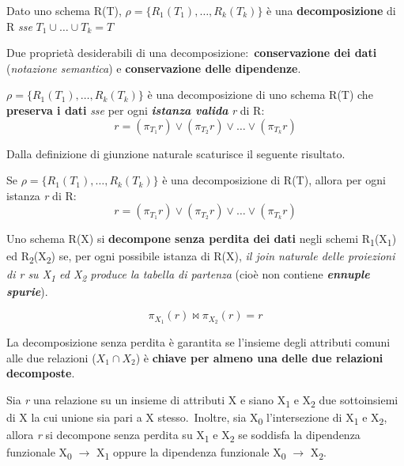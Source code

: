 \begin{definition}
	Dato uno schema R(T),
	$\rho = \{R_1(T_1), \dots, R_k(T_k)\}$ è una \textbf{decomposizione} di R \textit{sse} $T_1 \cup \dots \cup T_k = T$
\end{definition}

\noindent Due proprietà desiderabili di una decomposizione:\ \textbf{conservazione dei dati} (\textit{notazione semantica}) e \textbf{conservazione delle dipendenze}.\

\begin{definition}
	$\rho = \{R_1(T_1), \dots, R_k(T_k) \}$ è una decomposizione di uno schema R(T) che \textbf{preserva i dati} \textit{sse} per ogni \textbf{\textit{istanza valida}} \textit{r} di R:\
	\[
		r = (\pi_{T_1}r) \lor (\pi_{T_2}r) \lor \dots \lor (\pi_{T_k}r)
	\]
\end{definition}

\noindent Dalla definizione di giunzione naturale scaturisce il seguente risultato.\

\begin{theorem}
	Se $\rho = \{R_1(T_1), \dots, R_k(T_k)\}$ è una decomposizione di R(T), allora per ogni istanza \textit{r} di R:
	\[
		r = (\pi_{T_1}r) \lor (\pi_{T_2}r) \lor \dots \lor (\pi_{T_k}r)
	\]
\end{theorem}

\noindent Uno schema R(X) si \textbf{decompone senza perdita dei dati} negli schemi R\textsubscript{1}(X\textsubscript{1}) ed R\textsubscript{2}(X\textsubscript{2}) se, per ogni possibile istanza di R(X), \textit{il join naturale delle proiezioni di r su X\textsubscript{1} ed X\textsubscript{2} produce la tabella di partenza} (cioè non contiene \textbf{\textit{ennuple spurie}}).

\[
	\pi_{X_1}(r) \Join \pi_{X_2}(r) = r
\]

\noindent La decomposizione senza perdita è garantita se l'insieme degli attributi comuni alle due relazioni ($X_1 \cap X_2$) è \textbf{chiave per almeno una delle due relazioni decomposte}.

Sia \textit{r} una relazione su un insieme di attributi X e siano X\textsubscript{1} e X\textsubscript{2} due sottoinsiemi di X la cui unione sia pari a X stesso.\
Inoltre, sia X\textsubscript{0} l'intersezione di X\textsubscript{1} e X\textsubscript{2}, allora \textit{r} si decompone senza perdita su X\textsubscript{1} e X\textsubscript{2} se soddisfa la dipendenza funzionale X\textsubscript{0} $\rightarrow$ X\textsubscript{1} oppure la dipendenza funzionale X\textsubscript{0} $\rightarrow$ X\textsubscript{2}.

